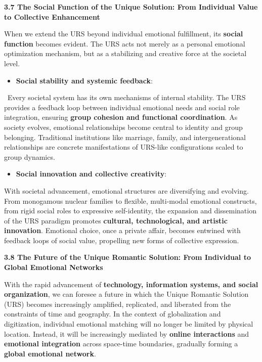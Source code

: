 \documentclass[a4paper]{article}
\begin{document}
\textbf{3.7 The Social Function of the Unique Solution: From Individual Value to Collective Enhancement}

When we extend the URS beyond individual emotional fulfillment, its \textbf{social function} becomes evident. The URS
acts not merely as a personal emotional optimization mechanism, but as a stabilizing and creative force at the societal
level.

\begin{itemize}[series=listWWNumvii,label=[F0B7?]]
\item \textbf{Social stability and systemic feedback}:
\end{itemize}
\ Every societal system has its own mechanisms of internal stability. The URS provides a feedback loop between
individual emotional needs and social role integration, ensuring \textbf{group cohesion and functional coordination}.
As society evolves, emotional relationships become central to identity and group belonging. Traditional institutions
like marriage, family, and intergenerational relationships are concrete manifestations of URS-like configurations
scaled to group dynamics.

\begin{itemize}[resume*=listWWNumvii]
\item \textbf{Social innovation and collective creativity}:
\end{itemize}
With societal advancement, emotional structures are diversifying and evolving. From monogamous nuclear families to
flexible, multi-modal emotional constructs, from rigid social roles to expressive self-identity, the expansion and
dissemination of the URS paradigm promotes \textbf{cultural, technological, and artistic innovation}. Emotional choice,
once a private affair, becomes entwined with feedback loops of social value, propelling new forms of collective
expression.

\textbf{3.8 The Future of the Unique Romantic Solution: From Individual to Global Emotional Networks}

With the rapid advancement of \textbf{technology, information systems, and social organization}, we can foresee a future
in which the Unique Romantic Solution (URS) becomes increasingly amplified, replicated, and liberated from the
constraints of time and geography. In the context of globalization and digitization, individual emotional matching will
no longer be limited by physical location. Instead, it will be increasingly mediated by \textbf{online interactions}
and \textbf{emotional integration} across space-time boundaries, gradually forming a \textbf{global emotional network}.
\end{document}
